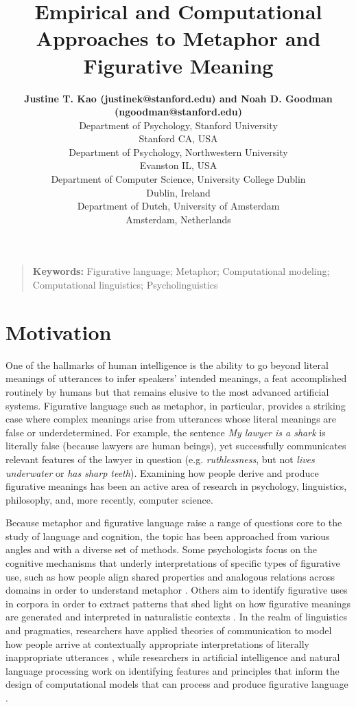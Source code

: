 \documentclass[10pt,letterpaper]{article}
\title{Empirical and Computational Approaches to Metaphor and Figurative Meaning}
\author{{\large \bf Justine T. Kao (justinek@stanford.edu) and Noah D. Goodman (ngoodman@stanford.edu)} \\ 
  Department of Psychology, 
  Stanford University \\ Stanford CA, USA 
  \AND {\large \bf Francisco Maravilla (fmaravil@gmail.com) and Dedre Gentner (gentner@northwestern.edu)} \\
  Department of Psychology, Northwestern University \\
  Evanston IL, USA
  \AND {\large \bf Tony Veale (tony.veale@ucd.ie)} \\
  Department of Computer Science, University College Dublin\\
  Dublin, Ireland
    \AND {\large \bf Gerard Steen (g.j.steen@uva.nl)} \\
  Department of Dutch, University of Amsterdam \\
Amsterdam, Netherlands
  }
\begin{document}
\maketitle

\begin{quote}
\small
\textbf{Keywords:} 
Figurative language; Metaphor; Computational modeling; Computational linguistics; Psycholinguistics
\end{quote}

\section{Motivation}
One of the hallmarks of human intelligence is the ability to go beyond literal meanings of utterances to infer speakers' intended meanings, a feat accomplished routinely by humans but that remains elusive to the most advanced artificial systems. Figurative language such as metaphor, in particular, provides a striking case where complex meanings arise from utterances whose literal meanings are false or underdetermined. For example, the sentence \emph{My lawyer is a shark} is literally false (because lawyers are human beings), yet successfully communicates relevant features of the lawyer in question (e.g. \emph{ruthlessness}, but not \emph{lives underwater} or \emph{has sharp teeth}). Examining how people derive and produce figurative meanings has been an active area of research in psychology, linguistics, philosophy, and, more recently, computer science. 


Because metaphor and figurative language raise a range of questions core to the study of language and cognition, the topic has been approached from various angles and with a diverse set of methods. Some psychologists focus on the cognitive mechanisms that underly interpretations of specific types of figurative use, such as how people align shared properties and analogous relations across domains in order to understand metaphor \cite{gentner1983structure, gentner2001metaphor}. 
Others aim to identify figurative uses in corpora in order to extract patterns that shed light on how figurative meanings are generated and interpreted in naturalistic contexts \cite{steen2010method}. In the realm of linguistics and pragmatics, researchers have applied theories of communication to model how people arrive at contextually appropriate interpretations of literally inappropriate utterances \cite{kao2014nonliteral, wilson2006metaphor, gibbs2012interpreting}, while researchers in artificial intelligence and natural language processing work on identifying features and principles that inform the design of computational models that can process and produce figurative language \cite{veale2000computation, veale2007comprehending}.
\end{document}
